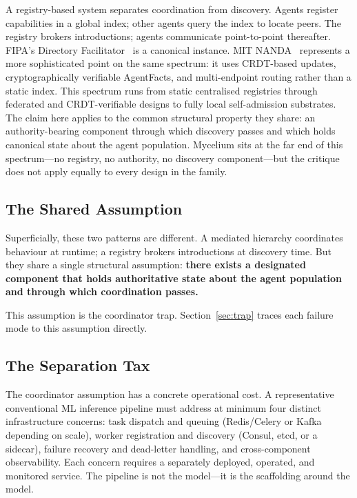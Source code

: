 \documentclass[11pt]{article}
\begin{document}
A registry-based system separates coordination from discovery. Agents register
capabilities in a global index; other agents query the index to locate peers. The
registry brokers introductions; agents communicate point-to-point thereafter.
FIPA's Directory Facilitator~\cite{fipa,jade} is a canonical instance. MIT
NANDA~\cite{nanda} represents a more sophisticated point on the same spectrum:
it uses CRDT-based updates, cryptographically verifiable AgentFacts, and
multi-endpoint routing rather than a static index. This spectrum runs from
static centralised registries through federated and CRDT-verifiable designs to
fully local self-admission substrates. The claim here applies to the common
structural property they share: an authority-bearing component through which
discovery passes and which holds canonical state about the agent population.
Mycelium sits at the far end of this spectrum---no registry, no authority, no
discovery component---but the critique does not apply equally to every design
in the family.

\subsection{The Shared Assumption}

Superficially, these two patterns are different. A mediated hierarchy coordinates
behaviour at runtime; a registry brokers introductions at discovery time. But they
share a single structural assumption: \textbf{there exists a designated component
that holds authoritative state about the agent population and through which
coordination passes.}

This assumption is the coordinator trap. Section~\ref{sec:trap} traces each
failure mode to this assumption directly.

\subsection{The Separation Tax}

The coordinator assumption has a concrete operational cost. A representative
conventional ML inference pipeline must address at minimum four distinct
infrastructure concerns: task dispatch and queuing (Redis/Celery or Kafka
depending on scale), worker registration and discovery (Consul, etcd, or a
sidecar), failure recovery and dead-letter handling, and cross-component
observability. Each concern requires a separately deployed, operated, and
monitored service. The pipeline is not the model---it is the scaffolding around
the model.
\end{document}

